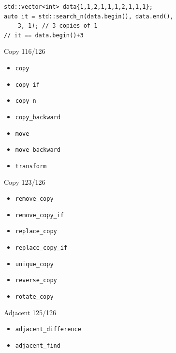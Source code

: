 \documentclass[aspectratio=169]{beamer}
\begin{document}
\begin{frame}[fragile]{}
\begin{verbatim}
std::vector<int> data{1,1,2,1,1,1,2,1,1,1};
auto it = std::search_n(data.begin(), data.end(),
    3, 1); // 3 copies of 1
// it == data.begin()+3
\end{verbatim}
\end{frame}

\begin{frame}{Copy 116/126}
  \begin{itemize}
    \item{\texttt{copy}}
    \item{\texttt{copy_if}}
    \item{\texttt{copy_n}}
    \item{\texttt{copy_backward}}
    \item{\texttt{move}}
    \item{\texttt{move_backward}}
    \item{\texttt{transform}}
  \end{itemize}
\end{frame}

\begin{frame}{Copy 123/126}
  \begin{itemize}
    \item{\texttt{remove_copy}}
    \item{\texttt{remove_copy_if}}
    \item{\texttt{replace_copy}}
    \item{\texttt{replace_copy_if}}
    \item{\texttt{unique_copy}}
    \item{\texttt{reverse_copy}}
    \item{\texttt{rotate_copy}}
  \end{itemize}
\end{frame}

\begin{frame}{Adjacent 125/126}
  \begin{itemize}
    \item{\texttt{adjacent_difference}}
    \item{\texttt{adjacent_find}}
  \end{itemize}
\end{frame}
\end{document}
